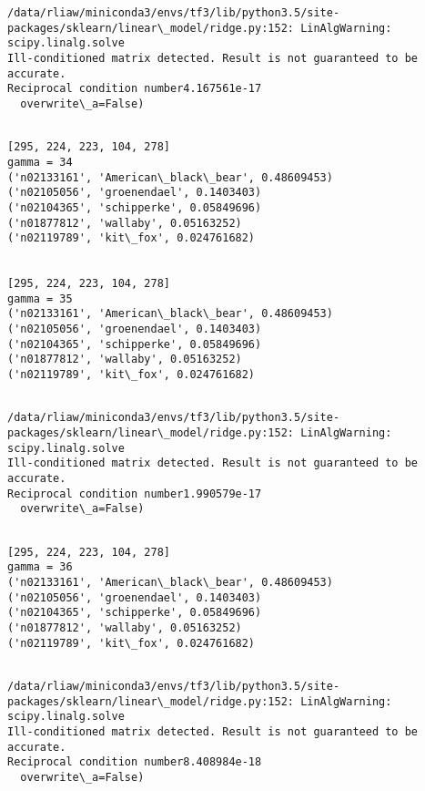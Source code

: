 \documentclass[11pt]{article}
\begin{document}
    \begin{Verbatim}[commandchars=\\\{\}]
/data/rliaw/miniconda3/envs/tf3/lib/python3.5/site-packages/sklearn/linear\_model/ridge.py:152: LinAlgWarning: scipy.linalg.solve
Ill-conditioned matrix detected. Result is not guaranteed to be accurate.
Reciprocal condition number4.167561e-17
  overwrite\_a=False)

    \end{Verbatim}

    \begin{Verbatim}[commandchars=\\\{\}]

[295, 224, 223, 104, 278]
gamma = 34
('n02133161', 'American\_black\_bear', 0.48609453)
('n02105056', 'groenendael', 0.1403403)
('n02104365', 'schipperke', 0.05849696)
('n01877812', 'wallaby', 0.05163252)
('n02119789', 'kit\_fox', 0.024761682)


[295, 224, 223, 104, 278]
gamma = 35
('n02133161', 'American\_black\_bear', 0.48609453)
('n02105056', 'groenendael', 0.1403403)
('n02104365', 'schipperke', 0.05849696)
('n01877812', 'wallaby', 0.05163252)
('n02119789', 'kit\_fox', 0.024761682)


    \end{Verbatim}

    \begin{Verbatim}[commandchars=\\\{\}]
/data/rliaw/miniconda3/envs/tf3/lib/python3.5/site-packages/sklearn/linear\_model/ridge.py:152: LinAlgWarning: scipy.linalg.solve
Ill-conditioned matrix detected. Result is not guaranteed to be accurate.
Reciprocal condition number1.990579e-17
  overwrite\_a=False)

    \end{Verbatim}

    \begin{Verbatim}[commandchars=\\\{\}]

[295, 224, 223, 104, 278]
gamma = 36
('n02133161', 'American\_black\_bear', 0.48609453)
('n02105056', 'groenendael', 0.1403403)
('n02104365', 'schipperke', 0.05849696)
('n01877812', 'wallaby', 0.05163252)
('n02119789', 'kit\_fox', 0.024761682)


    \end{Verbatim}

    \begin{Verbatim}[commandchars=\\\{\}]
/data/rliaw/miniconda3/envs/tf3/lib/python3.5/site-packages/sklearn/linear\_model/ridge.py:152: LinAlgWarning: scipy.linalg.solve
Ill-conditioned matrix detected. Result is not guaranteed to be accurate.
Reciprocal condition number8.408984e-18
  overwrite\_a=False)

    \end{Verbatim}
\end{document}

